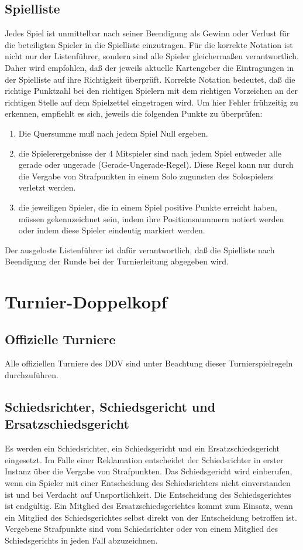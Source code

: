 \documentclass[12pt]{scrartcl}
\begin{document}
\subsection{Spielliste}
Jedes Spiel ist unmittelbar nach seiner Beendigung als Gewinn
oder Verlust für die beteiligten Spieler in die Spielliste
einzutragen. Für die korrekte Notation ist nicht nur der
Listenführer, sondern sind alle Spieler gleichermaßen
verantwortlich. Daher wird empfohlen, daß der jeweils aktuelle
Kartengeber die Eintragungen in der Spielliste auf ihre
Richtigkeit überprüft. Korrekte Notation bedeutet, daß die
richtige Punktzahl bei den richtigen Spielern mit dem richtigen
Vorzeichen an der richtigen Stelle auf dem Spielzettel eingetragen
wird. Um hier Fehler frühzeitig zu erkennen, empfiehlt es sich,
jeweils die folgenden Punkte zu überprüfen:
\begin{enumerate}
  \item Die Quersumme muß nach jedem Spiel Null ergeben.
  \item die Spielerergebnisse der 4 Mitspieler sind nach jedem Spiel entweder alle gerade oder ungerade (Gerade-Ungerade-Regel).
    Diese Regel kann nur durch die Vergabe von Strafpunkten in einem Solo zugunsten des Solospielers verletzt werden.
  \item die jeweiligen Spieler, die in einem Spiel positive Punkte erreicht haben, müssen gekennzeichnet sein, indem
    ihre Positionsnummern notiert werden oder indem diese Spieler
    eindeutig markiert werden.
\end{enumerate}
Der ausgeloste Listenführer ist dafür verantwortlich, daß die Spielliste nach Beendigung der Runde bei der
Turnierleitung abgegeben wird.


\section{Turnier-Doppelkopf}

\subsection{Offizielle Turniere}
Alle offiziellen Turniere des DDV sind unter Beachtung dieser Turnierspielregeln durchzuführen.

\subsection{Schiedsrichter, Schiedsgericht und Ersatzschiedsgericht}
Es werden ein Schiedsrichter, ein Schiedsgericht und ein
Ersatzschiedsgericht eingesetzt. Im Falle einer Reklamation
entscheidet der Schiedsrichter in erster Instanz über die
Vergabe von Strafpunkten. Das Schiedsgericht wird einberufen,
wenn ein Spieler mit einer Entscheidung des Schiedsrichters nicht
einverstanden ist und bei Verdacht auf Unsportlichkeit. Die
Entscheidung des Schiedsgerichtes ist endgültig. Ein Mitglied
des Ersatzschiedsgerichtes kommt zum Einsatz, wenn ein Mitglied
des Schiedsgerichtes selbst direkt von der Entscheidung betroffen
ist. Vergebene Strafpunkte sind vom Schiedsrichter oder von einem
Mitglied des Schiedsgerichts in jeden Fall abzuzeichnen.
\end{document}
